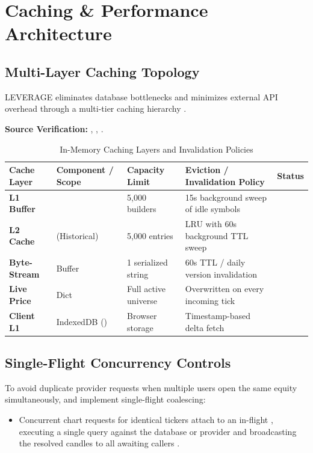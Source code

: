 \chapter{Caching \& Performance Architecture}
\label{ch:caching_performance}

\section{Multi-Layer Caching Topology}
LEVERAGE eliminates database bottlenecks and minimizes external API overhead through a multi-tier caching hierarchy \cite{ref:candle_cache,ref:live_tf_mgr}.

\begin{citationbox}
\textbf{Source Verification:} , , .
\end{citationbox}

\begin{table}[htbp]
\centering
\small
\sffamily
\caption{In-Memory Caching Layers and Invalidation Policies}
\label{tab:cache_layers}
\begin{tabularx}{\linewidth}{p{24mm} p{34mm} p{24mm} Y p{20mm}}
\toprule
\textbf{Cache Layer} & \textbf{Component / Scope} & \textbf{Capacity Limit} & \textbf{Eviction / Invalidation Policy} & \textbf{Status} \\
\midrule
\textbf{L1 Buffer} &  & 5,000 builders & 15s background sweep of idle symbols &  \\
\textbf{L2 Cache} &  (Historical) & 5,000 entries & LRU with 60s background TTL sweep &  \\
\textbf{Byte-Stream} &  Buffer & 1 serialized string & 60s TTL / daily version invalidation &  \\
\textbf{Live Price} &  Dict & Full active universe & Overwritten on every incoming tick &  \\
\textbf{Client L1} & IndexedDB () & Browser storage & Timestamp-based delta fetch &  \\
\bottomrule
\end{tabularx}
\end{table}

\section{Single-Flight Concurrency Controls}
To avoid duplicate provider requests when multiple users open the same equity simultaneously,  and  implement single-flight coalescing:
\begin{itemize}[leftmargin=6mm,itemsep=1.5mm]
    \item Concurrent chart requests for identical tickers attach to an in-flight , executing a single query against the database or provider and broadcasting the resolved candles to all awaiting callers .
\end{itemize}
